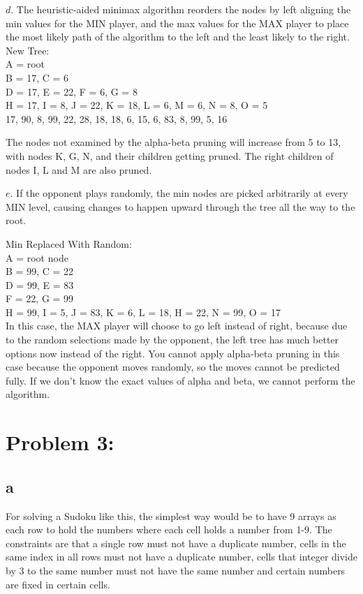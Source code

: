 \documentclass[11pt, oneside]{article}   	%
\begin{document}
\begin{flushleft}
$d$. The heuristic-aided minimax algorithm reorders the nodes by left aligning the min values for the MIN player, and the max values for the MAX player to place the most likely path of the algorithm to the left and the least likely to the right.\\
New Tree: \\
A = root\\
B = 17, C = 6\\
D = 17, E = 22, F = 6, G = 8\\
H = 17, I = 8, J = 22, K = 18, L = 6, M = 6, N = 8, O = 5\\
17, 90, 8, 99, 22, 28, 18, 18, 6, 15, 6, 83, 8, 99, 5, 16 \\\medskip

The nodes not examined by the alpha-beta pruning will increase from 5 to 13, with nodes K, G, N, and their children getting pruned. The right children of nodes I, L and M are also pruned.\\\medskip

$e$. If the opponent plays randomly, the min nodes are picked arbitrarily at every MIN level, causing changes to happen upward through the tree all the way to the root. \\\medskip

Min Replaced With Random:\\
A = root node\\
B = 99, C = 22\\
D = 99, E = 83 \\
F = 22, G = 99 \\
H = 99, I = 5, J = 83, K = 6, L = 18, H = 22, N = 99, O = 17 \\\medskip
In this case, the MAX player will choose to go left instead of right, because due to the random selections made by the opponent, the left tree has much better options now instead of the right. You cannot apply alpha-beta pruning in this case because the opponent moves randomly, so the moves cannot be predicted fully. If we don't know the exact values of alpha and beta, we cannot perform the algorithm.\\\medskip


\section*{Problem 3:}
\subsection*{a}
For solving a Sudoku like this, the simplest way would be to have 9 arrays as each row to hold the numbers where each cell holds a number from 1-9. The constraints are that a single row must not have a duplicate number, cells in the same index in all rows must not have a duplicate number, cells that integer divide by 3 to the same number must not have the same number and certain numbers are fixed in certain cells.

\end{flushleft}
\end{document}

